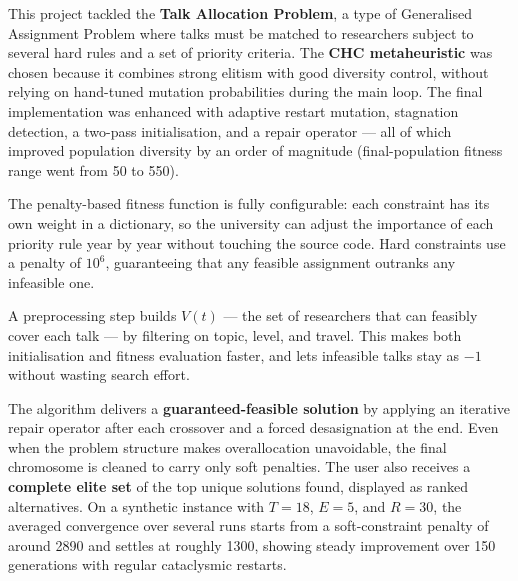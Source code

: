 \documentclass[12pt, a4paper]{article}
\begin{document}
This project tackled the \textbf{Talk Allocation Problem}, a type of
Generalised Assignment Problem where talks must be matched to researchers
subject to several hard rules and a set of priority criteria. The
\textbf{CHC metaheuristic} was chosen because it combines strong elitism with
good diversity control, without relying on hand-tuned mutation probabilities
during the main loop. The final implementation was enhanced with adaptive
restart mutation, stagnation detection, a two-pass initialisation, and a
repair operator — all of which improved population diversity by an order of
magnitude (final-population fitness range went from 50 to 550).

The penalty-based fitness function is fully configurable: each constraint
has its own weight in a dictionary, so the university can adjust the
importance of each priority rule year by year without touching the source
code. Hard constraints use a penalty of $10^6$, guaranteeing that any
feasible assignment outranks any infeasible one.

A preprocessing step builds $V(t)$ — the set of researchers that can
feasibly cover each talk — by filtering on topic, level, and travel.
This makes both initialisation and fitness evaluation faster, and lets
infeasible talks stay as $-1$ without wasting search effort.

The algorithm delivers a \textbf{guaranteed-feasible solution} by applying an
iterative repair operator after each crossover and a forced desasignation
at the end. Even when the problem structure makes overallocation unavoidable,
the final chromosome is cleaned to carry only soft penalties. The user
also receives a \textbf{complete elite set} of the top unique solutions
found, displayed as ranked alternatives. On a synthetic instance with
$T=18$, $E=5$, and $R=30$, the averaged convergence over several runs
starts from a soft-constraint penalty of around 2890 and settles at
roughly 1300, showing steady improvement over 150 generations with
regular cataclysmic restarts.
\end{document}

